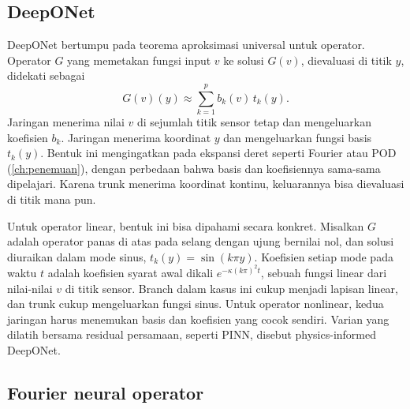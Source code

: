 \subsection{DeepONet}

DeepONet \citep{lu2021} bertumpu pada teorema aproksimasi universal untuk operator. Operator $G$ yang
memetakan fungsi input $v$ ke solusi $G(v)$, dievaluasi di titik $y$, didekati sebagai
\begin{equation}
G(v)(y)\approx\sum_{k=1}^pb_k(v)\,t_k(y).
\end{equation}
Jaringan  menerima nilai $v$ di sejumlah titik sensor tetap dan mengeluarkan koefisien
$b_k$. Jaringan  menerima koordinat $y$ dan mengeluarkan fungsi basis $t_k(y)$. Bentuk ini
mengingatkan pada ekspansi deret seperti Fourier atau POD (\cref{ch:penemuan}), dengan perbedaan bahwa
basis dan koefisiennya sama-sama dipelajari. Karena trunk menerima koordinat kontinu, keluarannya bisa
dievaluasi di titik mana pun.

Untuk operator linear, bentuk ini bisa dipahami secara konkret. Misalkan $G$ adalah operator panas di atas pada selang
dengan ujung bernilai nol, dan solusi diuraikan dalam mode sinus, $t_k(y)=\sin(k\pi y)$. Koefisien setiap mode pada waktu
$t$ adalah koefisien syarat awal dikali $e^{-\kappa(k\pi)^2t}$, sebuah fungsi linear dari nilai-nilai $v$ di titik
sensor. Branch dalam kasus ini cukup menjadi lapisan linear, dan trunk cukup mengeluarkan fungsi sinus. Untuk
operator nonlinear, kedua jaringan harus menemukan basis dan koefisien yang cocok sendiri. Varian yang dilatih
bersama residual persamaan, seperti PINN, disebut physics-informed DeepONet.

\subsection{Fourier neural operator}


